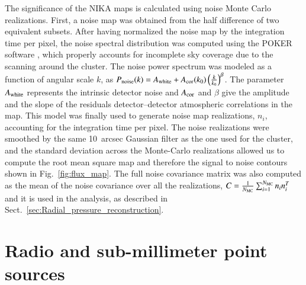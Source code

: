 \documentclass[twocolumn,traditabstract]{aa}
\begin{document}
The significance of the NIKA maps is calculated using noise Monte Carlo realizations. First, a noise map was obtained from the half difference of two equivalent subsets. After having normalized the noise map by the integration time per pixel, the noise spectral distribution was computed using the POKER software \citep{ponthieu2011}, which properly accounts for incomplete sky coverage due to the scanning around the cluster. The noise power spectrum was modeled as a function of angular scale $k$, as $P_{\rm noise}(k) = A_{\rm white} + A_{\rm cor}(k_0) \left(\frac{k}{k_0}\right)^{\beta}$. The parameter $A_{\rm white}$ represents the intrinsic detector noise and $A_{\rm cor}$ and $\beta$ give the amplitude and the slope of the residuals detector--detector atmospheric correlations in the map. This model was finally used to generate noise map realizations, $n_i$, accounting for the integration time per pixel. The noise realizations were smoothed by the same 10~arcsec Gaussian filter as the one used for the cluster, and the standard deviation across the Monte-Carlo realizations allowed us to compute the root mean square map and therefore the signal to noise contours shown in Fig.~\ref{fig:flux_map}. The full noise covariance matrix was also computed as the mean of the noise covariance over all the realizations, $C = \frac{1}{N_{\rm MC}}\sum_{i=1}^{N_{\rm MC}}n_i n_i^{T}$ and it is used in the analysis, as described in Sect.~\ref{sec:Radial_pressure_reconstruction}.

\section{Radio and sub-millimeter point sources}\label{Radio_and_infrared_point_sources}
\end{document}
